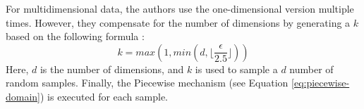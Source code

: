 For multidimensional data, the authors use the one-dimensional version multiple times.
However, they compensate for the number of dimensions by generating a $k$ based on the following formula \citep{wang_collecting_2019}:
\begin{equation}
  k = max (1, min (d, \lfloor \frac{\epsilon}{2.5} \rfloor))
\end{equation}
Here, $d$ is the number of dimensions, and $k$ is used to sample a $d$ number of random samples.
Finally, the Piecewise mechanism (see Equation \ref{eq:piecewise-domain}) is executed for each sample.

